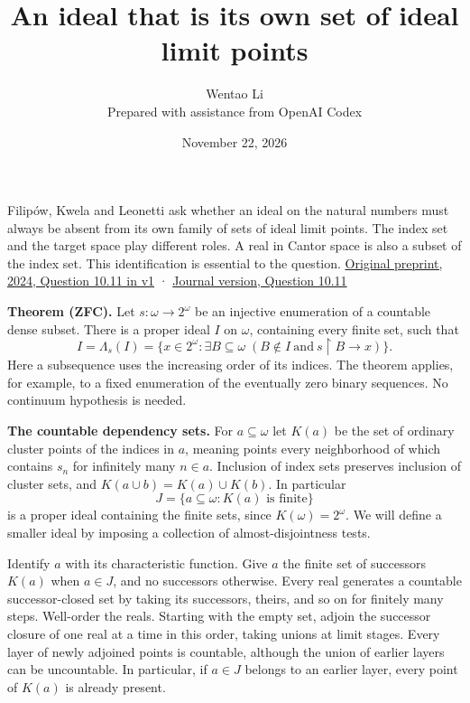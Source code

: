 \documentclass[11pt]{article}
\author{Wentao Li\\\small Prepared with assistance from OpenAI Codex}
\date{November 22, 2026}
\title{An ideal that is its own set of ideal limit points}
\begin{document}
\maketitle
Filipów, Kwela and Leonetti ask whether an ideal on the natural numbers must always be absent from its own family of sets of ideal limit points. The index set and the target space play different roles. A real in Cantor space is also a subset of the index set. This identification is essential to the question. \href{https://arxiv.org/abs/2411.10866}{Original preprint, 2024, Question 10.11 in v1} · \href{https://doi.org/10.1017/jsl.2026.10181}{Journal version, Question 10.11}

\textbf{Theorem (ZFC).} Let \(s:\omega\to 2^\omega\) be an injective enumeration of a countable dense subset. There is a proper ideal \(I\) on \(\omega\), containing every finite set, such that \[I=\Lambda_s(I)=\{x\in2^\omega:\exists B\subseteq\omega\;(B\notin I\ \text{and}\ s\!\upharpoonright B\longrightarrow x)\}.\] Here a subsequence uses the increasing order of its indices. The theorem applies, for example, to a fixed enumeration of the eventually zero binary sequences. No continuum hypothesis is needed.

\textbf{The countable dependency sets.} For \(a\subseteq\omega\) let \(K(a)\) be the set of ordinary cluster points of the indices in \(a\), meaning points every neighborhood of which contains \(s_n\) for infinitely many \(n\in a\). Inclusion of index sets preserves inclusion of cluster sets, and \(K(a\cup b)=K(a)\cup K(b)\). In particular \[J=\{a\subseteq\omega: K(a)\text{ is finite}\}\] is a proper ideal containing the finite sets, since \(K(\omega)=2^\omega\). We will define a smaller ideal by imposing a collection of almost-disjointness tests.

Identify \(a\) with its characteristic function. Give \(a\) the finite set of successors \(K(a)\) when \(a\in J\), and no successors otherwise. Every real generates a countable successor-closed set by taking its successors, theirs, and so on for finitely many steps. Well-order the reals. Starting with the empty set, adjoin the successor closure of one real at a time in this order, taking unions at limit stages. Every layer of newly adjoined points is countable, although the union of earlier layers can be uncountable. In particular, if \(a\in J\) belongs to an earlier layer, every point of \(K(a)\) is already present.
\end{document}
